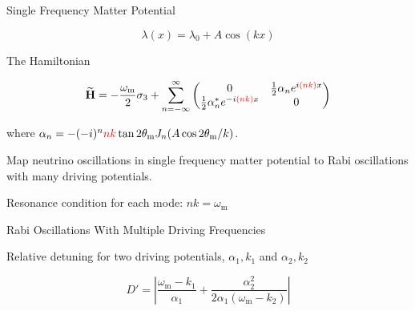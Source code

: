 \begin{frame}{Single Frequency Matter Potential}



\begin{equation*}
\lambda(x) = \lambda_0 +  A \cos(k x )
\end{equation*}


\begin{tcolorbox}[title=Hamiltonian in Rabi Basis]

The Hamiltonian


\begin{equation*}
\mathbf{\widetilde H}= -\frac{\omega_{\mathrm m}}{2}\sigma_3 + \sum_{n=-\infty}^{\infty} \begin{pmatrix}
0 & \frac{1}{2}  \alpha_n e^{i  {\color{red} (n k) } x}\\
\frac{1}{2}  \alpha_n^* e^{ -i  {\color{red} (n k) } x} & 0
\end{pmatrix}
\end{equation*}


where $\alpha_n =  - (-i)^n  {\color{red}n  k} \tan 2\theta_{\mathrm{m}}  J_n ( A \cos 2\theta_{\mathrm{m}} / k )$.


\end{tcolorbox}







\begin{tcolorbox}
\centering
Map neutrino oscillations in single frequency matter potential to Rabi oscillations with many driving potentials.
\end{tcolorbox}

\pause
\begin{tcolorbox}
\centering
Resonance condition for each mode: $nk=\omega_{\mathrm m}$
\end{tcolorbox}




\end{frame}



\begin{frame}{Rabi Oscillations With Multiple Driving Frequencies}




Relative detuning for two driving potentials, $\alpha_1,k_1$ and $\alpha_2, k_2$

\begin{equation*}
D' =  \left\vert \frac{\omega_{\mathrm m} - k_1 }{\alpha_1} + \frac{\alpha_2^2}{2\alpha_1(\omega_{\mathrm m}-k_2)} \right\vert
\end{equation*}

%

\end{frame}


